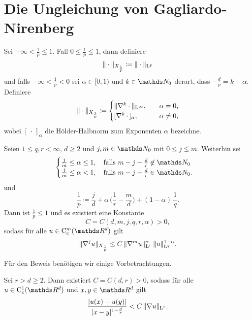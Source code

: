 \chapter{Die Ungleichung von Gagliardo-Nirenberg}

\begin{ntion}
  Sei $-\infty < \frac{1}{p} \leq 1$.
  Fall $0 \leq \frac{1}{p} \leq 1$, dann definiere
  $$
  \| \cdot \|_{X_{\frac{1}{p}}} \coloneqq \| \cdot \|_{\mathrm{L}^p}
  $$
  und falls $-\infty < \frac{1}{p} < 0$ sei $\alpha \in [0,1)$ und $k \in \N_0$ derart, dass $-\frac{d}{p} = k + \alpha$. Definiere
  $$
  \| \cdot \|_{X_{\frac{1}{p}}} \coloneqq 
  \begin{cases} 
    \| \nabla^k \cdot \|_{\mathrm{L}^\infty}, \quad &\alpha = 0, \\ [ \nabla^k \, \cdot \, ]_\alpha, \quad &\alpha \neq 0,
  \end{cases}
  $$
  wobei $[\,\cdot\,]_\alpha$ die Hölder-Halbnorm zum Exponenten $\alpha$ bezeichne.
\end{ntion}

\begin{hsatz}
  \label{hsatz:gagliardoNirenberg}
  Seien $1 \leq q,r < \infty$, $d \geq 2$ und $j,m \in \N_0$ mit $0 \leq j \lneq m$.
  Weiterhin sei
  $$
  \begin{cases}
    \frac{j}{m} \leq \alpha \leq 1, \quad \text{falls } m - j - \frac{d}{r} \not\in \N_0 \\
    \frac{j}{m} \leq \alpha < 1, \quad \text{falls } m - j - \frac{d}{r} \in \N_0.
  \end{cases}
    $$
    und
    $$
    \frac{1}{p} \coloneqq \frac{j}{d} + \alpha\, \Big( \frac{1}{r} - \frac{m}{d} \Big) + (1 - \alpha) \, \frac{1}{q}.
    $$
    Dann ist $\frac{1}{p} \leq 1$ und es existiert eine Konstante
    $$
    C = C(d,m,j,q,r,\alpha) > 0,
    $$
    sodass für alle $u \in \CC_c^m(\R^d)$ gilt
    $$
    \| \nabla^j u\|_{X_{\frac{1}{p}}} \leq C \, \|\nabla^m u\|_{\mathrm{L}^r}^\alpha \, \|u\|_{\mathrm{L}^q}^{1 - \alpha}.
    $$
\end{hsatz}

Für den Beweis benötigen wir einige Vorbetrachtungen.

\begin{lem}
  \label{lem:hoelderIneq}
  Sei $r > d \geq 2$.
  Dann existiert $C = C(d,r) > 0$, sodass für alle $u \in \CC_c^1(\R^d)$ und $x,y \in \R^d$ gilt
  $$
  \frac{\left| u(x) - u(y) \right|}{|x - y|^{1 - \frac{d}{r}}} < C \, \|\nabla u\|_{\mathrm{L}^r}.
  $$
\end{lem}

